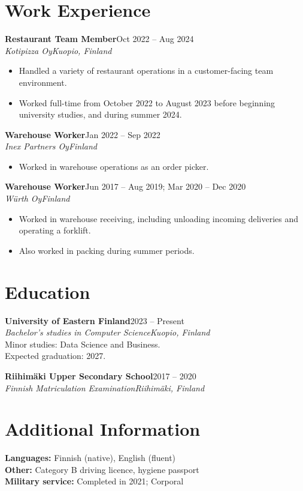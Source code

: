 \documentclass[a4paper,10pt]{article}
\newcommand{\cvItem}[1]{\item \small{#1}}
\newcommand{\cvSubheading}[4]{%
  \textbf{#1}\hfill {\small #2}\\
  \textit{\small #3}\hfill \textit{\small #4}\\[-3pt]
}
\begin{document}
\section*{Work Experience}

\cvSubheading{Restaurant Team Member}{Oct 2022 -- Aug 2024}{Kotipizza Oy}{Kuopio, Finland}
\begin{itemize}
  \cvItem{Handled a variety of restaurant operations in a customer-facing team environment.}
  \cvItem{Worked full-time from October 2022 to August 2023 before beginning university studies, and during summer 2024.}
\end{itemize}

\cvSubheading{Warehouse Worker}{Jan 2022 -- Sep 2022}{Inex Partners Oy}{Finland}
\begin{itemize}
  \cvItem{Worked in warehouse operations as an order picker.}
\end{itemize}

\cvSubheading{Warehouse Worker}{Jun 2017 -- Aug 2019; Mar 2020 -- Dec 2020}{Würth Oy}{Finland}
\begin{itemize}
  \cvItem{Worked in warehouse receiving, including unloading incoming deliveries and operating a forklift.}
  \cvItem{Also worked in packing during summer periods.}
\end{itemize}

\section*{Education}

\cvSubheading{University of Eastern Finland}{2023 -- Present}{Bachelor's studies in Computer Science}{Kuopio, Finland}
\small Minor studies: Data Science and Business.\\
Expected graduation: 2027.
\normalsize

\cvSubheading{Riihimäki Upper Secondary School}{2017 -- 2020}{Finnish Matriculation Examination}{Riihimäki, Finland}

\section*{Additional Information}
\small
\textbf{Languages:} Finnish (native), English (fluent)\\
\textbf{Other:} Category B driving licence, hygiene passport\\
\textbf{Military service:} Completed in 2021; Corporal
\normalsize
\end{document}
